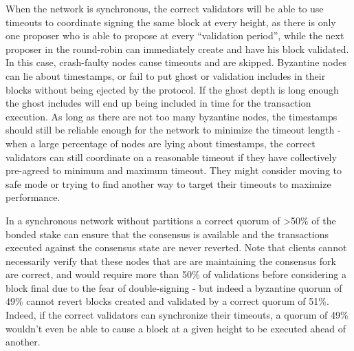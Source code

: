 \documentclass[11pt,a4paper]{article}
\begin{document}
When the network is synchronous, the correct validators will be able to use timeouts to coordinate signing the same block at every height, as there is only one proposer who is able to propose at every ``validation period'', while the next proposer in the round-robin can immediately create and have his block validated. In this case, crash-faulty nodes cause timeouts and are skipped. Byzantine nodes can lie about timestamps, or fail to put ghost or validation includes in their blocks without being ejected by the protocol. If the ghost depth is long enough the ghost includes will end up being included in time for the transaction execution. As long as there are not too many byzantine nodes, the timestamps should still be reliable enough for the network to minimize the timeout length - when a large percentage of nodes are lying about timestamps, the correct validators can still coordinate on a reasonable timeout if they have collectively pre-agreed to minimum and maximum timeout. They might consider moving to safe mode or trying to find another way to target their timeouts to maximize performance. 

In a synchronous network without partitions a correct quorum of >50\% of the bonded stake can ensure that the consensus is available and the transactions executed against the consensus state are never reverted. Note that clients cannot necessarily verify that these nodes that are are maintaining the consensus fork are correct, and would require more than 50\% of validations before considering a block final due to the fear of double-signing - but indeed a byzantine quorum of 49\% cannot revert blocks created and validated by a correct quorum of 51\%. Indeed, if the correct validators can synchronize their timeouts, a quorum of 49\% wouldn't even be able to cause a block at a given height to be executed ahead of another.
\end{document}
